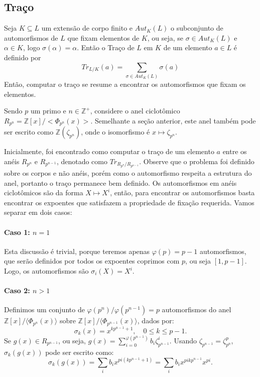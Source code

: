 \subsection{Traço}
Seja $K \subseteq L $ um extensão de corpo finito e $Aut_K(L)$ o subconjunto de automorfismos
de $L$ que fixam elementos de $K$, ou seja, se $\sigma \in Aut_K(L)$ e $\alpha \in K$, logo $\sigma(\alpha) = \alpha$. Então o Traço de $L$ em $K$ de um elemento $a \in L$ é definido por 
\begin{equation}
    Tr_{L/K}(a) = \sum_{\sigma \in Aut_K(L)} \sigma(a)  
\end{equation} 
Então, computar o traço se resume a encontrar os automorfismos que fixam os elementos.

Sendo $p$ um primo e $n \in \mathbb{Z}^{+}$, considere o anel ciclotômico  
$R_{p^n} = \mathbb{Z}[x]/<\Phi_{p^n}(x)>$. Semelhante a seção anterior, este anel também pode ser escrito como $\mathbb{Z}(\zeta_{p^n})$, onde o isomorfismo é $x \mapsto \zeta_{p^n}$.

Inicialmente, foi encontrado como computar o traço de um elemento $a$ entre os anéis $R_{p^n}$ e $R_{p^{n-1}}$, denotado como $Tr_{R_{p^n}/R_{p^{n-1}}}$.
Observe que o problema foi definido sobre os corpos e não anéis, porém como o automorfismo respeita a estrutura do anel, portanto o traço permanece bem definido. Os automorfismos em anéis ciclotômicos são da forma $X \mapsto X^i$, então, para encontrar os automorfismos basta encontrar os expoentes que satisfazem a propriedade de fixação requerida. 
Vamos separar em dois casos:

\paragraph{Caso 1: $n=1$} 
    Esta discussão é trivial, porque teremos apenas $\varphi(p) = p-1$
    automorfismos, que serão definidos por todos os expoentes coprimos com $p$,
    ou seja $[1,p-1]$. Logo, os automorfismos são $\sigma_i(X) = X^i$.

\paragraph{Caso 2: $n>1$} 
Definimos um conjunto de $\varphi(p^n)/\varphi(p^{n-1}) = p$ automorfismos do anel $\mathbb{Z}[x]/\langle \Phi_{p^n}(x) \rangle$ sobre $\mathbb{Z}[x]/\langle \Phi_{p^{n-1}}(x) \rangle$, dados por:
\[
\sigma_k(x) = x^{k p^{n-1} + 1}, \quad 0 \leq k \leq p-1.
\]
Se $g(x) \in R_{p^{n-1}}$, ou seja, $g(x) = \sum_{i=0}^{\varphi(p^{n-1})} b_i \zeta_{p^{n-1}}^i$. Usando $\zeta_{p^{n-1}} = \zeta_{p^n}^p$, $\sigma_k(g(x))$ pode ser escrito como:
\[
\sigma_k(g(x)) = \sum_i b_i x^{pi(k p^{n-1} + 1)} = \sum_i b_i x^{p i k p^{n-1}} x^{pi}.
\]

